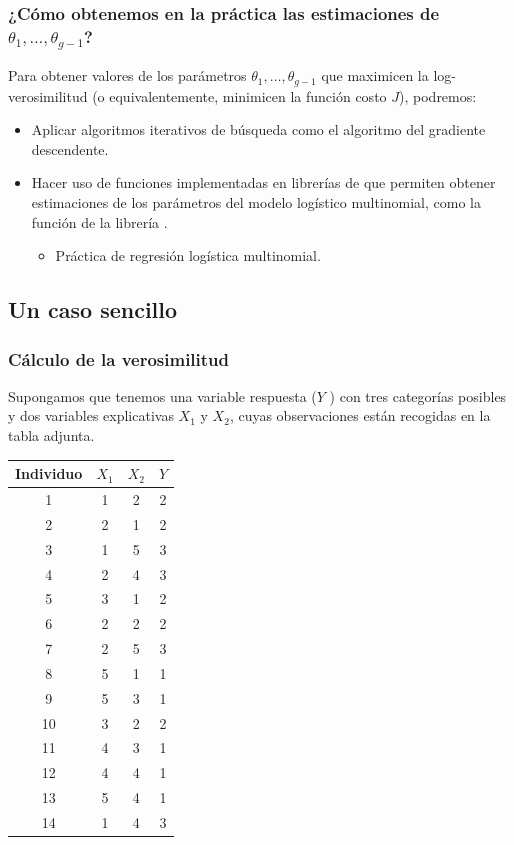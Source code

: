 \subsubsection{¿Cómo obtenemos en la práctica las estimaciones de $\theta_1,\dots,\theta_{g-1}$?}
Para obtener valores de los parámetros $\theta_1,\dots,\theta_{g-1}$ que maximicen la log-verosimilitud (o equivalentemente, minimicen la función costo $J$), podremos:
\begin{itemize}
	\item Aplicar algoritmos iterativos de búsqueda como el algoritmo del gradiente descendente.
	\item Hacer uso de funciones implementadas en librerías de  que permiten obtener estimaciones de los parámetros del modelo logístico multinomial, como la función  de la librería .
	\begin{itemize}
		\item Práctica de regresión logística multinomial.
	\end{itemize}
\end{itemize}
\subsection{Un caso sencillo}
\subsubsection{Cálculo de la verosimilitud}
Supongamos que tenemos una variable respuesta ($Y$ ) con tres categorías posibles y dos variables explicativas $X_1$ y $X_2$, cuyas observaciones están recogidas en la tabla adjunta.

\begin{center}
	\begin{tabular}{c|ccc}
		Individuo & $X_1$ & $X_2$ & $Y$ \\
		\hline
		1 & 1 & 2 & 2 \\
		2 & 2 & 1 & 2 \\
		3 & 1 & 5 & 3 \\
		4 & 2 & 4 & 3 \\
		5 & 3 & 1 & 2 \\
		6 & 2 & 2 & 2 \\
		7 & 2 & 5 & 3 \\
		8 & 5 & 1 & 1 \\
		9 & 5 & 3 & 1 \\
		10 & 3 & 2 & 2 \\
		11 & 4 & 3 & 1 \\
		12 & 4 & 4 & 1 \\
		13 & 5 & 4 & 1 \\
		14 & 1 & 4 & 3 \\
		\hline
	\end{tabular}
\end{center}

